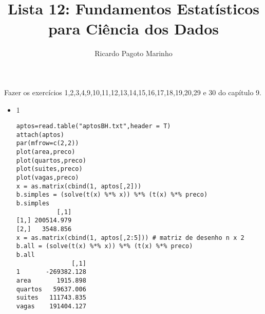 \documentclass[11pt,a4paper]{book}
\title{Lista 12: Fundamentos Estatísticos para Ciência dos Dados}
\author{Ricardo Pagoto Marinho}
\begin{document}
\maketitle
Fazer os exercícios 1,2,3,4,9,10,11,12,13,14,15,16,17,18,19,20,29 e 30 do capítulo 9.
	\begin{itemize}
		\item 1
		
		\begin{lstlisting}
aptos=read.table("aptosBH.txt",header = T)
attach(aptos)
par(mfrow=c(2,2))
plot(area,preco)
plot(quartos,preco)
plot(suites,preco)
plot(vagas,preco)
x = as.matrix(cbind(1, aptos[,2]))
b.simples = (solve(t(x) %*% x)) %*% (t(x) %*% preco)
b.simples
           [,1]
[1,] 200514.979
[2,]   3548.856
x = as.matrix(cbind(1, aptos[,2:5])) # matriz de desenho n x 2
b.all = (solve(t(x) %*% x)) %*% (t(x) %*% preco)
b.all
               [,1]
1       -269382.128
area       1915.898
quartos   59637.006
suites   111743.835
vagas    191404.127
		\end{lstlisting}
		
	\end{itemize}
\end{document}
